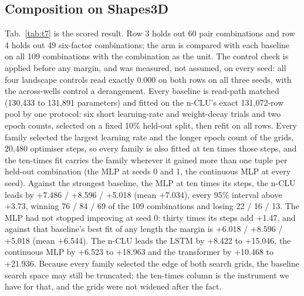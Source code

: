 \documentclass{article} %
\begin{document}
\subsection{Composition on Shapes3D}
\label{sec:shapes-t7}

Tab.~\ref{tab:t7} is the scored result. Row 3 holds out 60 pair combinations and row 4 holds out
49 six-factor combinations; the arm is compared with each baseline on all 109 combinations with the combination
as the unit. %
The control check is applied before any margin, and was measured, not assumed, on every seed:
all four landscape controls read exactly 0.000 on both rows on all three seeds, with the
across-wells control a derangement. %
Every baseline is read-path matched (130,433 to 131,891 parameters) and fitted on the n-CLU's exact
131,072-row pool by one protocol: six short learning-rate and weight-decay trials and two epoch
counts, selected on a fixed 10\% held-out split, then refit on all rows. Every family selected the
largest learning rate and the longer epoch count of the grids, 20,480 optimiser steps, so every
family is also fitted at ten times those steps, and the ten-times fit carries the family wherever
it gained more than one tuple per held-out combination (the MLP at seeds 0 and 1, the continuous MLP at every
seed). Against the strongest baseline, the MLP at ten times its steps, the n-CLU leads by +7.486 /
+8.596 / +5.018 (mean +7.034), every 95\% interval above +3.73, winning 76 / 84 / 69 of the 109
combinations and losing 22 / 16 / 13. The MLP had not stopped improving at seed 0: thirty times its steps
add +1.47, and against that baseline's best fit of any length the margin is +6.018 / +8.596 / +5.018
(mean +6.544). The n-CLU leads the LSTM by +8.422 to +15.046, the continuous MLP by +6.523 to +18.963
and the transformer by +10.468 to +21.936. Because every family selected the edge of both search
grids, the baseline search space may still be truncated; the ten-times column is the instrument we
have for that, and the grids were not widened after the fact.
\end{document}
